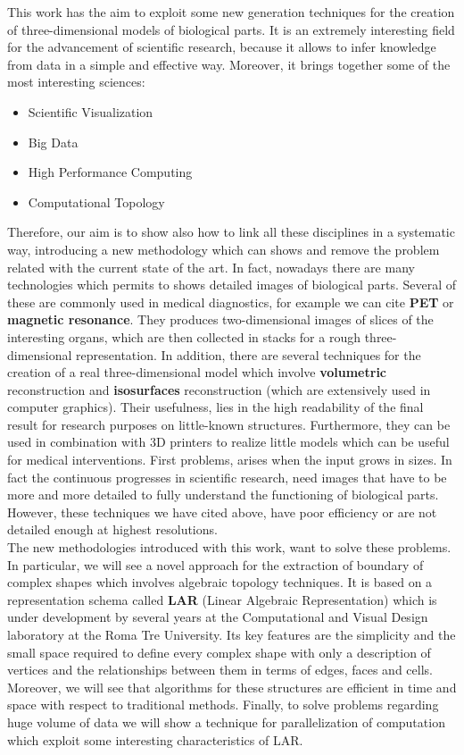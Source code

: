 This work has the aim to exploit some new generation techniques for the creation of three-dimensional models of biological parts. It is an extremely interesting field for the advancement of scientific research, because it allows to infer knowledge from data in a simple and effective way. Moreover, it brings together some of the most interesting sciences:

\begin{itemize}
 \item Scientific Visualization
 \item Big Data
 \item High Performance Computing
 \item Computational Topology
\end{itemize}

Therefore, our aim is to show also how to link all these disciplines in a systematic way, introducing a new methodology which can shows and remove the problem related with the current state of the art. In fact, nowadays there are many technologies which permits to shows detailed images of biological parts. Several of these are commonly used in medical diagnostics, for example we can cite \textbf{PET} or \textbf{magnetic resonance}. They produces two-dimensional images of slices of the interesting organs, which are then collected in stacks for a rough three-dimensional representation. In addition, there are several techniques for the creation of a real three-dimensional model which involve \textbf{volumetric} reconstruction and \textbf{isosurfaces} reconstruction (which are extensively used in computer graphics). Their usefulness, lies in the high readability of the final result for research purposes on little-known structures. Furthermore, they can be used in combination with 3D printers to realize little models which can be useful for medical interventions. First problems, arises when the input grows in sizes. In fact the continuous progresses in scientific research, need images that have to be more and more detailed to fully understand the functioning of biological parts. However, these techniques we have cited above, have poor efficiency or are not detailed enough at highest resolutions.\\


The new methodologies introduced with this work, want to solve these problems. In particular, we will see a novel approach for the extraction of boundary of complex shapes which involves algebraic topology techniques. It is based on a representation schema called \textbf{LAR} (Linear Algebraic Representation) which is under development by several years at the Computational and Visual Design laboratory at the Roma Tre University. Its key features are the simplicity and the small space required to define every complex shape with only a description of vertices and the relationships between them in terms of edges, faces and cells. Moreover, we will see that algorithms for these structures are efficient in time and space with respect to traditional methods. Finally, to solve problems regarding huge volume of data we will show a technique for parallelization of computation which exploit some interesting characteristics of LAR.\\

